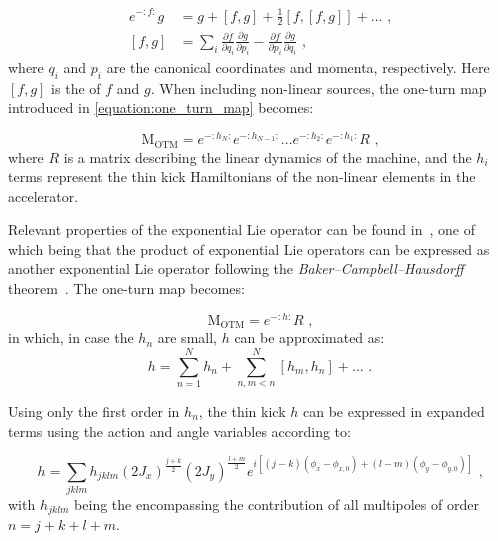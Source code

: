 \begin{equation}
    \begin{aligned}
        e^{-:f:} g          &= g + \left[f, g\right] + \frac{1}{2} \left[f, \left[f, g \right] \right] + \ldots \text{ ,} \\
        \left[ f, g \right] &= \sum_i \frac{\partial f}{\partial q_i} \frac{\partial g}{\partial p_i} - \frac{\partial f}{\partial p_i} \frac{\partial g}{\partial q_i} \text{ ,}
    \end{aligned}
    \label{equation:lie_operator}
\end{equation}
where \(q_i\) and \(p_i\) are the canonical coordinates and momenta, respectively.
Here \(\left[ f, g \right]\) is the  of \(f\) and \(g\).
When including non-linear sources, the one-turn map introduced in \cref{equation:one_turn_map} becomes:

\begin{equation}
    \mathrm{M_{OTM}} =e^{-:h_N:} e^{-:h_{N-1}:} \ldots e^{-:h_2:} e^{-:h_1:} R \text{ ,}
    \label{equation:one_turn_map_non_linear}
\end{equation}
where \(R\) is a matrix describing the linear dynamics of the machine, and the \(h_i\) terms represent the thin kick Hamiltonians of the non-linear elements in the accelerator.
\break

Relevant properties of the exponential Lie operator can be found in~\cite{PHD:Tomas, PHD:Franchi}, one of which being that the product of exponential Lie operators can be expressed as another exponential Lie operator following the \emph{Baker–Campbell–Hausdorff} theorem~\cite{BOOK:Hall:Lie_Group_Algebra_Representations}.
The one-turn map becomes:

\begin{equation}
    \mathrm{M_{OTM}} = e^{-:h:} R \text{ ,}
    \label{equation:Campbell_Baker_Hausdorff_theorem}
\end{equation}
in which, in case the \(h_n\) are small, \(h\) can be approximated as:
\begin{equation}
    h = \sum_{n=1}^N h_n + \sum_{n, m<n}^N \left[ h_m, h_n \right] + \ldots \text{ .}
    \label{equation:h_thin_kick_approximation}
\end{equation}

Using only the first order in \(h_n\), the thin kick \(h\) can be expressed in expanded terms using the action and angle variables according to:

\begin{equation}
    h = \sum_{jklm} h_{jklm} \left( 2 J_x \right)^{\frac{j+k}{2}} \left( 2 J_y \right)^{\frac{l+m}{2}} e^{i \left[ \left(j-k\right) \left(\phi_x - \phi_{x,0} \right) + \left(l-m\right) \left(\phi_y - \phi_{y,0} \right) \right]} \text{ ,}
    \label{equation:h_thin_kick_expansion}
\end{equation}
with \(h_{jklm}\) being the  encompassing the contribution of all multipoles of order \(n = j + k + l + m\). 

